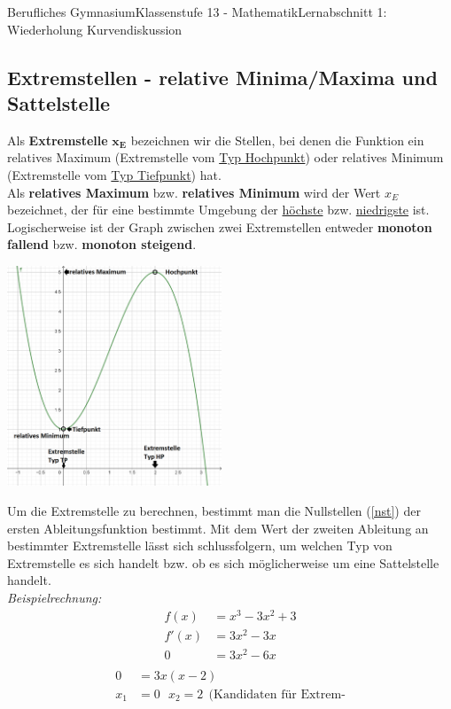 \documentclass[11pt,twocolumn,oneside,openany,headings=optiontotoc,11pt,numbers=noenddot]{article}
\begin{document}
\begin{worksheet}{Berufliches Gymnasium}{Klassenstufe 13 - Mathematik}{Lernabschnitt 1: Wiederholung Kurvendiskussion}
		\subsection{Extremstellen - relative Minima/Maxima und Sattelstelle}
		Als \textbf{Extremstelle} \(\mathbf{x_E}\) bezeichnen wir die Stellen, bei denen die Funktion ein relatives Maximum (Extremstelle vom \underline{Typ Hochpunkt}) oder relatives Minimum (Extremstelle vom \underline{Typ Tiefpunkt}) hat.\\
		Als \textbf{relatives Maximum} bzw. \textbf{relatives Minimum} wird der Wert \(x_E\) bezeichnet, der für eine bestimmte Umgebung der \underline{höchste} bzw. \underline{niedrigste} ist.\\
		Logischerweise ist der Graph zwischen zwei Extremstellen entweder \textbf{monoton fallend} bzw. \textbf{monoton steigend}.\\
		\par\bigskip\noindent
		\includegraphics[width=0.48\textwidth]{../99_Bilder/00_Wdh/EP.png}\\
		\par\bigskip\noindent
		Um die Extremstelle zu berechnen, bestimmt man die Nullstellen (\ref{nst}) der ersten Ableitungsfunktion bestimmt. Mit dem Wert der zweiten Ableitung an bestimmter Extremstelle lässt sich schlussfolgern, um welchen Typ von Extremstelle es sich handelt bzw. ob es sich möglicherweise um eine Sattelstelle handelt.\\
		\textit{Beispielrechnung:}
		\begin{align*}
			f(x) & = x^3 - 3x^2 +3\\
			f'(x) & = 3x^2 - 3x\\
			0 & = 3x^2 - 6x\\
		\end{align*}
		\begin{align*}
			0 & = 3x(x-2)\\
			x_1 & = 0\ \ \ x_2=2\ \ (\text{Kandidaten für Extrem-}\\

\end{align*}
\end{worksheet}
\end{document}
